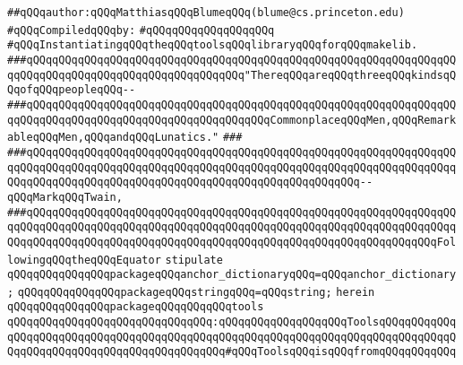 \label{src/lib/core/makelib/tools.pkg}
\verb|##qQQqauthor:qQQqMatthiasqQQqBlumeqQQq(blume@cs.princeton.edu)|\newline
\newline
\verb|#qQQqCompiledqQQqby:|\newline
\verb|#qQQqqQQqqQQqqQQqqQQq|\newline
\newline
\verb|#qQQqInstantiatingqQQqtheqQQqtoolsqQQqlibraryqQQqforqQQqmakelib.|\newline
\newline
\newline
\newline
\verb|###qQQqqQQqqQQqqQQqqQQqqQQqqQQqqQQqqQQqqQQqqQQqqQQqqQQqqQQqqQQqqQQqqQQqqQQqqQQqqQQqqQQqqQQqqQQqqQQqqQQqqQQq"ThereqQQqareqQQqthreeqQQqkindsqQQqofqQQqpeopleqQQq--|\newline
\verb|###qQQqqQQqqQQqqQQqqQQqqQQqqQQqqQQqqQQqqQQqqQQqqQQqqQQqqQQqqQQqqQQqqQQqqQQqqQQqqQQqqQQqqQQqqQQqqQQqqQQqqQQqqQQqCommonplaceqQQqMen,qQQqRemarkableqQQqMen,qQQqandqQQqLunatics."|\newline
\verb|###|\newline
\verb|###qQQqqQQqqQQqqQQqqQQqqQQqqQQqqQQqqQQqqQQqqQQqqQQqqQQqqQQqqQQqqQQqqQQqqQQqqQQqqQQqqQQqqQQqqQQqqQQqqQQqqQQqqQQqqQQqqQQqqQQqqQQqqQQqqQQqqQQqqQQqqQQqqQQqqQQqqQQqqQQqqQQqqQQqqQQqqQQqqQQqqQQqqQQqqQQq--qQQqMarkqQQqTwain,|\newline
\verb|###qQQqqQQqqQQqqQQqqQQqqQQqqQQqqQQqqQQqqQQqqQQqqQQqqQQqqQQqqQQqqQQqqQQqqQQqqQQqqQQqqQQqqQQqqQQqqQQqqQQqqQQqqQQqqQQqqQQqqQQqqQQqqQQqqQQqqQQqqQQqqQQqqQQqqQQqqQQqqQQqqQQqqQQqqQQqqQQqqQQqqQQqqQQqqQQqqQQqqQQqqQQqFollowingqQQqtheqQQqEquator|\newline
\newline
\newline
\newline
\verb|stipulate|\newline
\verb|qQQqqQQqqQQqqQQqpackageqQQqanchor_dictionaryqQQq=qQQqanchor_dictionary;|\newline
\verb|qQQqqQQqqQQqqQQqpackageqQQqstringqQQq=qQQqstring;|\newline
\verb|herein|\newline
\verb|qQQqqQQqqQQqqQQqpackageqQQqqQQqqQQqtools|\newline
\verb|qQQqqQQqqQQqqQQqqQQqqQQqqQQqqQQq:qQQqqQQqqQQqqQQqqQQqToolsqQQqqQQqqQQqqQQqqQQqqQQqqQQqqQQqqQQqqQQqqQQqqQQqqQQqqQQqqQQqqQQqqQQqqQQqqQQqqQQqqQQqqQQqqQQqqQQqqQQqqQQqqQQqqQQqqQQq#qQQqToolsqQQqisqQQqfromqQQqqQQqqQQq|\newline
